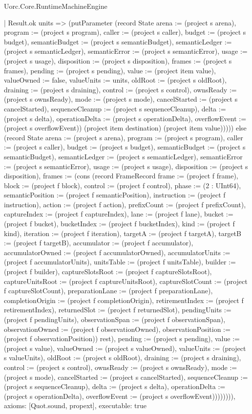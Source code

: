\begin{lexlean}{Uorc.Core.RuntimeMachineEngine}
\begin{semanticmodule}
{                | Result.ok units => (putParameter (record State {arena := (project s arena), program := (project s program), caller := (project s caller), budget := (project s budget), semanticBudget := (project s semanticBudget), semanticLedger := (project s semanticLedger), semanticError := (project s semanticError), usage := (project s usage), disposition := (project s disposition), frames := (project s frames), pending := (project s pending), value := (project item value), valueOwned := false, valueUnits := units, oldRoot := (project s oldRoot), draining := (project s draining), control := (project s control), ownsReady := (project s ownsReady), mode := (project s mode), cancelStarted := (project s cancelStarted), sequenceCleanup := (project s sequenceCleanup), delta := (project s delta), operationDelta := (project s operationDelta), overflowEvent := (project s overflowEvent)}) (project item destination) (project item value))))) else (record State {arena := (project s arena), program := (project s program), caller := (project s caller), budget := (project s budget), semanticBudget := (project s semanticBudget), semanticLedger := (project s semanticLedger), semanticError := (project s semanticError), usage := (project s usage), disposition := (project s disposition), frames := (cons (record FrameRecord {frame := (project f frame), block := (project f block), control := (project f control), phase := (2 : UInt64), semanticPosition := (project f semanticPosition), instruction := (project f instruction), action := (project f action), prefixCount := (project f prefixCount), captureIndex := (project f captureIndex), lane := (project f lane), bucket := (project f bucket), bucketIndex := (project f bucketIndex), kind := (project f kind), iteration := (project f iteration), targetA := (project f targetA), targetB := (project f targetB), accumulator := (project f accumulator), accumulatorOwned := (project f accumulatorOwned), accumulatorUnits := (project f accumulatorUnits), unitsTable := (project f unitsTable), builder := (project f builder), captureSlotsRoot := (project f captureSlotsRoot), captureUnitsRoot := (project f captureUnitsRoot), captureSlotCount := (project f captureSlotCount), preparationLane := (project f preparationLane), completionOrigin := (project f completionOrigin), retirementIndex := (project f retirementIndex), returnedSlot := (project f returnedSlot), pendingUnits := (project f pendingUnits), observationSpan := (project f observationSpan), observationOwned := (project f observationOwned), observationPosition := (project f observationPosition)}) rest), pending := (project s pending), value := (project s value), valueOwned := (project s valueOwned), valueUnits := (project s valueUnits), oldRoot := (project s oldRoot), draining := (project s draining), control := (project s control), ownsReady := (project s ownsReady), mode := (project s mode), cancelStarted := (project s cancelStarted), sequenceCleanup := (project s sequenceCleanup), delta := (project s delta), operationDelta := (project s operationDelta), overflowEvent := (project s overflowEvent)}))))))),
  axioms: [Quot.sound, propext],
  executable: true
}


\end{semanticmodule}
\end{lexlean}
